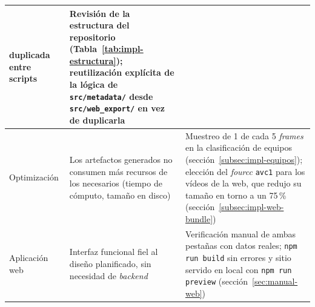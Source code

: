 \begin{table}[htp]
\begin{tabular}{|p{2.6cm}|p{4.5cm}|p{4.9cm}|}
  duplicada entre scripts & Revisión de la estructura del repositorio
  (Tabla~\ref{tab:impl-estructura}); reutilización explícita de la
  lógica de \texttt{src/metadata/} desde \texttt{src/web\_export/} en vez
  de duplicarla \\
\hline
Optimización & Los artefactos generados no consumen más recursos de los
  necesarios (tiempo de cómputo, tamaño en disco) & Muestreo de
  1 de cada 5 \emph{frames} en la clasificación de equipos
  (sección~\ref{subsec:impl-equipos}); elección del \emph{fourcc}
  \texttt{avc1} para los vídeos de la web, que redujo su tamaño en torno
  a un 75\,\% (sección~\ref{subsec:impl-web-bundle}) \\
\hline
Aplicación web & Interfaz funcional fiel al diseño planificado, sin
  necesidad de \emph{backend} & Verificación manual de ambas pestañas con
  datos reales; \texttt{npm run build} sin errores y sitio servido en
  local con \texttt{npm run preview} (sección~\ref{sec:manual-web}) \\
\hline
\end{tabular}
\end{table}
